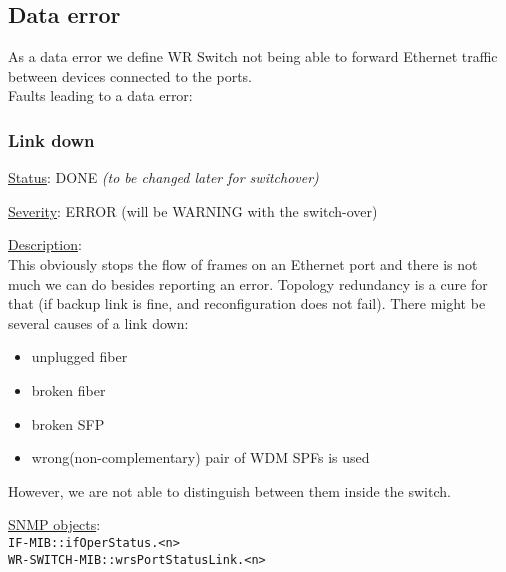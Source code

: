\newpage
\subsection{Data error}
As a data error we define WR Switch not being able to forward Ethernet traffic
between devices connected to the ports.\\

\noindent Faults leading to a data error:


\subsubsection{\bf Link down}
		\label{fail:data:link_down}
		\begin{packed_enum}
			\item [] \underline{Status}: DONE  \emph{(to be changed later for switchover)}
			\item [] \underline{Severity}: ERROR (will be WARNING with the
				switch-over)
			\item [] \underline{Description}:\\
				This obviously stops the flow of frames on an Ethernet port and there is
				not much we can do besides reporting an error. Topology redundancy is a
				cure for that (if backup link is fine, and reconfiguration does not
				fail). There might be several causes of a link down:
				\begin{itemize}
					\item unplugged fiber
					\item broken fiber
					\item broken SFP
					\item wrong(non-complementary) pair of WDM SPFs is used
				\end{itemize}
				However, we are not able to distinguish between them inside the switch.
			\item [] \underline{SNMP objects}:\\
				\texttt{IF-MIB::ifOperStatus.<n>}\\
				\texttt{WR-SWITCH-MIB::wrsPortStatusLink.<n>}
		\end{packed_enum}

